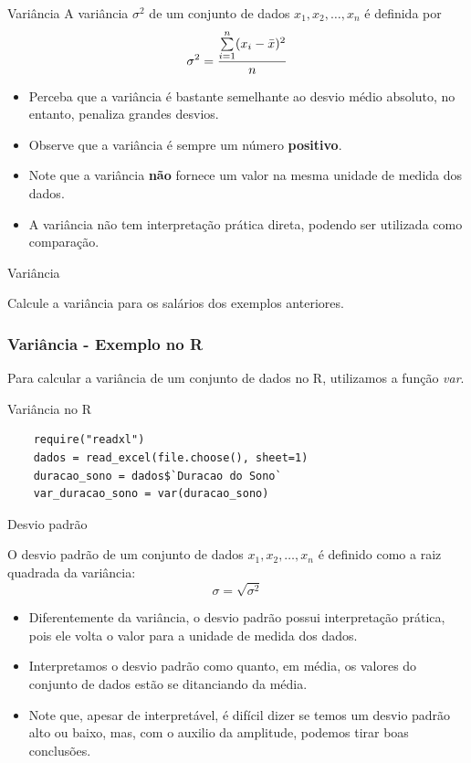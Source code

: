 \begin{frame}{Variância}
    A variância $\sigma^2$ de um conjunto de dados $x_1, x_2, \dots, x_n$ é definida por 
    $$\sigma^2 = \dfrac{\sum\limits_{i=1}^n (x_i - \Bar{x})^2}{n}$$
\pause
\begin{itemize}
    \item Perceba que a variância é bastante semelhante ao desvio médio absoluto, no entanto, penaliza grandes desvios. 
    \pause
    \item Observe que a variância é sempre um número \textbf{positivo}.
    \pause
    \item Note que a variância \textbf{não} fornece um valor na mesma unidade de medida dos dados. 
    \pause
    \item A variância não tem interpretação prática direta, podendo ser utilizada como comparação. 
\end{itemize}
\end{frame}

\begin{frame}{Variância}
\begin{exemplo}
    Calcule a variância para os salários dos exemplos anteriores. 
\end{exemplo}    
\end{frame}

\begin{frame}[fragile]
    \frametitle{Variância - Exemplo no R}   
    Para calcular a variância de um conjunto de dados no R, utilizamos a função \textit{var}.
    \begin{block}{Variância no R}
    \begin{verbatim}
    require("readxl")
    dados = read_excel(file.choose(), sheet=1) 
    duracao_sono = dados$`Duracao do Sono`
    var_duracao_sono = var(duracao_sono)
    \end{verbatim}
    \end{block}
\end{frame}

\begin{frame}{Desvio padrão}

O desvio padrão de um conjunto de dados $x_1, x_2, \dots, x_n$ é definido como a raiz 
quadrada da variância:
\pause
$$\sigma =\sqrt{\sigma^2}$$
\pause

\begin{itemize}
    \item Diferentemente da variância, o desvio padrão possui interpretação prática, pois ele volta o valor para a unidade de medida dos dados.
    \pause
    \item Interpretamos o desvio padrão como quanto, em média, os valores do conjunto de dados estão se ditanciando da média. 
    \pause
    \item Note que, apesar de interpretável, é difícil dizer se temos um desvio padrão alto ou baixo, mas, com o auxilio da amplitude, podemos tirar boas conclusões. 
\end{itemize}
\end{frame}

